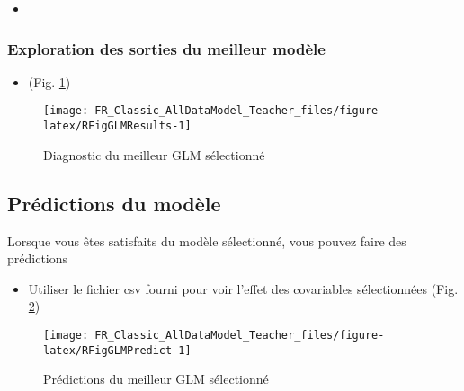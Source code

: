 \documentclass[french,a4paper]{article}
\providecommand{\tightlist}{%
  \setlength{\itemsep}{0pt}\setlength{\parskip}{0pt}}
\begin{document}
\begin{itemize}
\item
\end{itemize}

\hypertarget{exploration-des-sorties-du-meilleur-modele}{%
\subsubsection{Exploration des sorties du meilleur modèle}\label{exploration-des-sorties-du-meilleur-modele}}

\begin{itemize}
\tightlist
\item
   (Fig. \ref{fig:RFigGLMResults})
\end{itemize}



\begin{figure}[!h]

{\centering \texttt{[image: FR\_Classic\_AllDataModel\_Teacher\_files/figure-latex/RFigGLMResults-1]} 

}

\caption{Diagnostic du meilleur GLM sélectionné}\label{fig:RFigGLMResults}
\end{figure}

\hypertarget{predictions-du-modele}{%
\subsection{Prédictions du modèle}\label{predictions-du-modele}}

Lorsque vous êtes satisfaits du modèle sélectionné, vous pouvez faire des prédictions

\begin{itemize}
\tightlist
\item
  Utiliser le fichier csv fourni pour voir l'effet des covariables sélectionnées (Fig. \ref{fig:RFigGLMPredict})
\end{itemize}



\begin{figure}[!h]

{\centering \texttt{[image: FR\_Classic\_AllDataModel\_Teacher\_files/figure-latex/RFigGLMPredict-1]} 

}

\caption{Prédictions du meilleur GLM sélectionné}\label{fig:RFigGLMPredict}
\end{figure}
\end{document}
